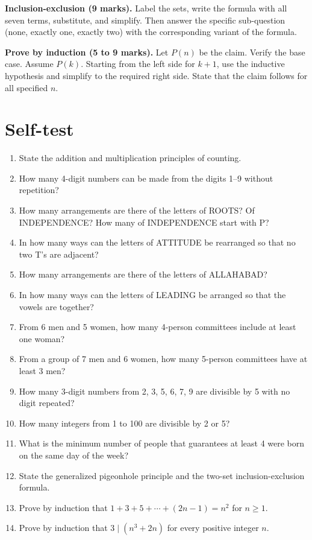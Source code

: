 \documentclass[11pt,a4paper]{article}
\begin{document}
\begin{answerbox}
\textbf{Inclusion-exclusion (9 marks).} Label the sets, write the formula with all seven terms, substitute, and simplify. Then answer the specific sub-question (none, exactly one, exactly two) with the corresponding variant of the formula.
\end{answerbox}

\begin{answerbox}
\textbf{Prove by induction (5 to 9 marks).} Let $P(n)$ be the claim. Verify the base case. Assume $P(k)$. Starting from the left side for $k+1$, use the inductive hypothesis and simplify to the required right side. State that the claim follows for all specified $n$.
\end{answerbox}

\section{Self-test}

\begin{enumerate}
\item State the addition and multiplication principles of counting.
\item How many 4-digit numbers can be made from the digits 1--9 without repetition?
\item How many arrangements are there of the letters of ROOTS? Of INDEPENDENCE? How many of INDEPENDENCE start with P?
\item In how many ways can the letters of ATTITUDE be rearranged so that no two T's are adjacent?
\item How many arrangements are there of the letters of ALLAHABAD?
\item In how many ways can the letters of LEADING be arranged so that the vowels are together?
\item From 6 men and 5 women, how many 4-person committees include at least one woman?
\item From a group of 7 men and 6 women, how many 5-person committees have at least 3 men?
\item How many 3-digit numbers from 2, 3, 5, 6, 7, 9 are divisible by 5 with no digit repeated?
\item How many integers from 1 to 100 are divisible by 2 or 5?
\item What is the minimum number of people that guarantees at least 4 were born on the same day of the week?
\item State the generalized pigeonhole principle and the two-set inclusion-exclusion formula.
\item Prove by induction that $1+3+5+\cdots+(2n-1)=n^2$ for $n\ge1$.
\item Prove by induction that $3\mid(n^3+2n)$ for every positive integer $n$.
\end{enumerate}
\end{document}
